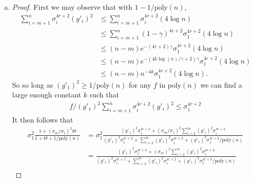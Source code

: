 \documentclass[11pt]{article}
\begin{document}
\begin{enumerate}[1.]
\begin{enumerate}[(a)]
\begin{proof}
\begin{align*}
  &\ge \sigma_1^2 - \frac{4(n-1)\sigma_1^{4r+2} \sigma_2^2\log n}{2^{4r} \sigma_1^{4r+2}(g'_1)^2}\\
  &= \sigma_1^2 - \frac{4(n-1)\log n}{2^{4r} (g'_1)^2} \sigma_2^2\\
  &\ge \sigma_1^2 - \frac{4(n-1)\log n \text{poly}(n)^2}{16^{k\log(n/\gamma)}} \sigma_2^2 \\
  &\hspace{150px} r = k\log(n/\gamma) = \Omega(\log(n/\gamma))\\
  &\ge \sigma_1^2 - \frac{4(n-1)\log n \text{poly}(n)^2}{(n/\gamma)^k}\sigma_2^2\\
  &\ge \sigma_1^2 - \gamma^k \sigma_2^2\\
  &\hspace{150px}\text{pick }k \text{ large enough so }n^k \ge 4(n-1)\log n \text{poly}(n)^2\\
  &\ge \sigma_1^2 - \gamma \sigma_2^2,
\end{align*}
where last step follows from $\gamma \le 1$.
\end{proof}
\item \begin{proof}
First we may observe that with $1 - 1/\text{poly}(n)$, 
\begin{align*}
  \sum_{i=m+1}^n \sigma_i^{4r+2} (g'_i)^2 &\le \sum_{i=m+1}^n \sigma_i^{4r+2} (4\log n)\\
  &\le \sum_{i=m+1}^n (1 - \gamma)^{4r+2}\sigma_1^{4r+2} (4\log n)\\
  &\le (n-m) e^{-(4r+2)\gamma} \sigma_1^{4r+2}(4\log n)\\
  &\le (n-m) e^{-(4k\log(n)/\gamma + 2)\gamma}\sigma_1^{4r+2}(4\log n)\\
  &\le (n-m) n^{-4k} \sigma_1^{4r+2}(4\log n).
\end{align*}
So so long as $(g'_1)^2 \ge 1/\text{poly}(n)$ for any $f$ in $\text{poly}(n)$ we can find a large enough constant $k$ such that
\begin{align*}
  f/(g'_1)^2\sum_{i=m+1}^n \sigma_i^{4r+2} (g'_i)^2 \le \sigma_1^{4r+2}
\end{align*}
It then follows that
\begin{align*}
  \sigma_1^2 \frac{1 + (\sigma_m/\sigma_1)^2 \Theta}{1 + \Theta + 1/\text{poly}(n)} &= \sigma_1^2 \frac{(g'_1)^2 \sigma_1^{4r+2} + (\sigma_m/\sigma_1)^2 \sum_{i=2}^m (g'_i)^2 \sigma_i^{4r+2}}{(g'_1)^2 \sigma_1^{4r+2} + \sum_{i=2}^m (g'_i)^2 \sigma_i^{4r+2} + (g'_1)^2 \sigma_1^{4r+2}/\text{poly}(n)}\\
  &= \frac{(g'_1)^2 \sigma_1^{4r+4} + (\sigma_m)^2 \sum_{i=2}^m (g'_i)^2 \sigma_i^{4r+2}}{(g'_1)^2 \sigma_1^{4r+2} + \sum_{i=2}^m (g'_i)^2 \sigma_i^{4r+2} + (g'_1)^2 \sigma_1^{4r+2}/\text{poly}(n)}\\

\end{align*}
\end{proof}
\end{enumerate}
\end{enumerate}
\end{document}
